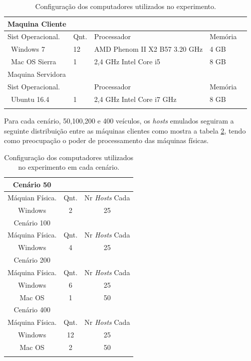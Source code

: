 \documentclass[
	12pt,				%
	oneside,			%
	a4paper,			%
	english,			%
	brazil				%
	]{abntex2ppgsi}
\begin{document}

\begin{longtable}{ |p{} |p{}  |p{}   |p{} | p{}} 
	\hline
	\rowcolor[gray]{0.7}
	 Maquina Cliente &	& 	&  \\ \hline
	\rowcolor[gray]{0.7}
	Sist Operacional.	& Qnt. & Processador	& Memória \\ \
	Windows 7	& 12 & AMD Phenom II X2 B57 3.20 GHz & 4 GB	\\ \
	Mac OS Sierra	& 1 & 2,4 GHz Intel Core i5	& 8 GB \\   \hline
	\rowcolor[gray]{0.7}
	 Maquina Servidora &	& 	&  \\ \hline
	\rowcolor[gray]{0.7}
	 Sist Operacional. &	& Processador	& Memória \\ \
	Ubuntu 16.4	& 1 & 2,4 GHz Intel Core i7 GHz & 8 GB	\\ \hline
	\caption{Configuração dos computadores utilizados no experimento. } 
	\label{tab:configuracaoMaquinas}
\end{longtable}

Para cada cenário, 50,100,200 e 400 veículos, os \textit{hosts} emulados seguiram a seguinte distribuição entre as máquinas clientes como mostra a tabela \ref{tab:configuracaoCenarios}, tendo como preocupação o poder de processamento das máquinas físicas.
\begin{longtable}{ |c |c |c |} 
	\hline
	\rowcolor[gray]{0.7}
	Cenário 50 &	& 	  \\ \hline
	\rowcolor[gray]{0.7}
	Máquian Física.	& Qnt. & Nr \textit{Hosts} Cada	 \\ \hline
	Windows	& 2 & 25 	\\ \hline
	\rowcolor[gray]{0.7}
	Cenário 100 &	& 	  \\ \hline
	\rowcolor[gray]{0.7}
	Máquina Física.	& Qnt. & Nr \textit{Hosts} Cada	 \\ \hline
	Windows	& 4 & 25 	\\ \hline
	\rowcolor[gray]{0.7}	
	Cenário 200 &	& 	  \\ \hline
	\rowcolor[gray]{0.7}
	Máquina Física.	& Qnt. & Nr \textit{Hosts} Cada	 \\ \hline
	Windows	& 6 & 25 	\\ \hline
	Mac OS	& 1 & 50 	\\ \hline
	\rowcolor[gray]{0.7}	
	Cenário 400 &	& 	  \\ \hline
	\rowcolor[gray]{0.7}
	Máquina Física.	& Qnt. & Nr \textit{Hosts} Cada	 \\ \hline
	Windows	& 12 & 25 	\\ \hline
	Mac OS	& 2 & 50 	\\ \hline
	\caption{Configuração dos computadores utilizados no experimento em cada cenário. } 
	\label{tab:configuracaoCenarios}
\end{longtable}
\end{document}
